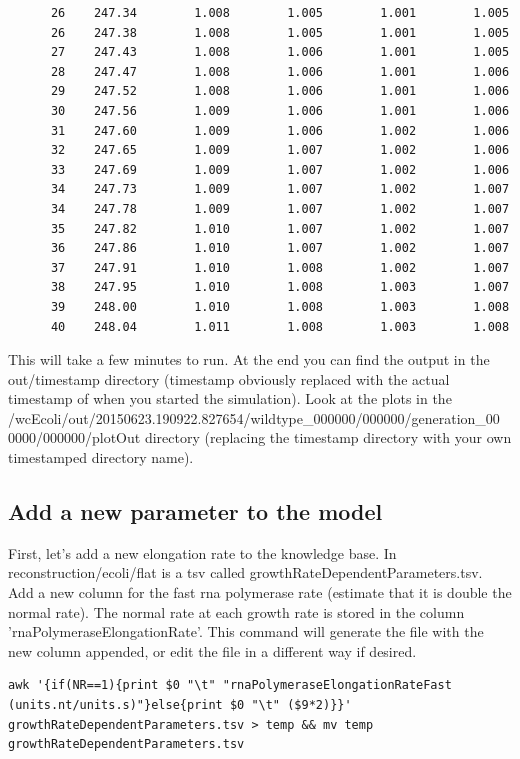 \documentclass[12pt]{article}
\begin{document}
\begin{lstlisting}
      26    247.34        1.008        1.005        1.001        1.005
      26    247.38        1.008        1.005        1.001        1.005
      27    247.43        1.008        1.006        1.001        1.005
      28    247.47        1.008        1.006        1.001        1.006
      29    247.52        1.008        1.006        1.001        1.006
      30    247.56        1.009        1.006        1.001        1.006
      31    247.60        1.009        1.006        1.002        1.006
      32    247.65        1.009        1.007        1.002        1.006
      33    247.69        1.009        1.007        1.002        1.006
      34    247.73        1.009        1.007        1.002        1.007
      34    247.78        1.009        1.007        1.002        1.007
      35    247.82        1.010        1.007        1.002        1.007
      36    247.86        1.010        1.007        1.002        1.007
      37    247.91        1.010        1.008        1.002        1.007
      38    247.95        1.010        1.008        1.003        1.007
      39    248.00        1.010        1.008        1.003        1.008
      40    248.04        1.011        1.008        1.003        1.008
\end{lstlisting}

\hfill \break
\hfill \break

This will take a few minutes to run. At the end you can find the output in the out/timestamp directory (timestamp obviously replaced with the actual timestamp of when you started the simulation). Look at the plots in the /wcEcoli/out/20150623.190922.827654/wildtype\_000000/000000/generation\_00
0000/000000/plotOut directory (replacing the timestamp directory with your own timestamped directory name).


\subsection{Add a new parameter to the model}

First, let’s add a new elongation rate to the knowledge base. In reconstruction/ecoli/flat is a tsv called growthRateDependentParameters.tsv. Add a new column for the fast rna polymerase rate (estimate that it is double the normal rate). The normal rate at each growth rate is stored in the column 'rnaPolymeraseElongationRate'. This command will generate the file with the new column appended, or edit the file in a different way if desired.

\begin{lstlisting}
awk '{if(NR==1){print $0 "\t" "rnaPolymeraseElongationRateFast (units.nt/units.s)"}else{print $0 "\t" ($9*2)}}' growthRateDependentParameters.tsv > temp && mv temp growthRateDependentParameters.tsv  
\end{lstlisting}
\end{document}
